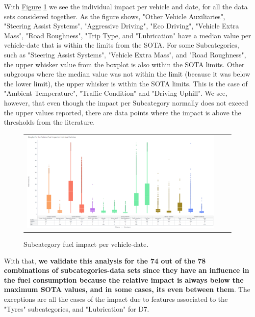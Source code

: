 With \hyperref[figure:ch6-BoxPlotVehicleFuelImpact]{Figure} \ref{figure:ch6-BoxPlotVehicleFuelImpact} we see the individual impact per vehicle and date, for all the data sets considered together. As the figure shows, "Other Vehicle Auxiliaries", "Steering Assist Systems", "Aggressive Driving", "Eco Driving", "Vehicle Extra Mass", "Road Roughness", "Trip Type, and "Lubrication" have a median value per vehicle-date that is within the limits from the SOTA. For some Subcategories, such as "Steering Assist Systems", "Vehicle Extra Mass", and "Road Roughness", the upper whisker value from the boxplot is also within the SOTA limits. Other subgroups where the median value was not within the limit (because it was below the lower limit), the upper whisker is within the SOTA limits. This is the case of "Ambient Temperature", "Traffic Condition" and "Driving Uphill".
We see, however, that even though the impact per Subcategory normally does not exceed the upper values reported, there are data points where the impact is above the thresholds from the literature. 

\begin{figure}[h!]
\centering
 \begin{tabular}{c@{\qquad}c@{\qquad}c}
\includegraphics[width=0.9 \columnwidth]{figures/chapter6_LucaFleet/BoxPlotImpact.PNG}
  \end{tabular} 
  \captionsetup{justification=centering}
  \caption{Subcategory fuel impact per vehicle-date.\label{figure:ch6-BoxPlotVehicleFuelImpact}}
\end{figure}

With that, \textbf{we validate this analysis for the 74 out of the 78 combinations of subcategories-data sets since they have an influence in the fuel consumption because the relative impact is always below the maximum SOTA values, and in some cases, its even between them}. The exceptions are all the cases of the impact due to features associated to the "Tyres" subcategories, and "Lubrication" for D7.


